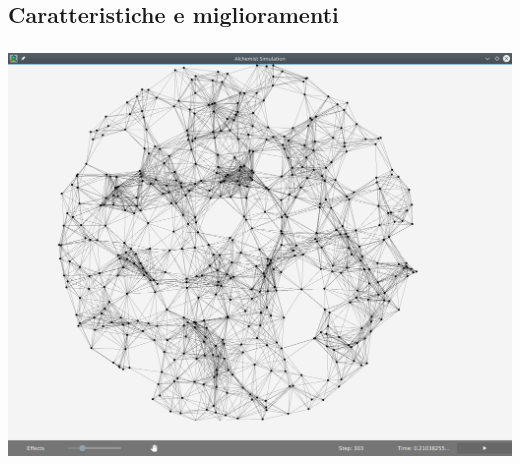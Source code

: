 \documentclass[%
]{beamer}
\begin{document}
        \subsection{Caratteristiche e miglioramenti}\label{subsec:feature}
            \begin{frame}
                \frametitle{\insertsection}
                \framesubtitle{\insertsubsection}
                \centering
                \includegraphics[scale=.27]{img/new/window_all}
            \end{frame}
\end{document}
